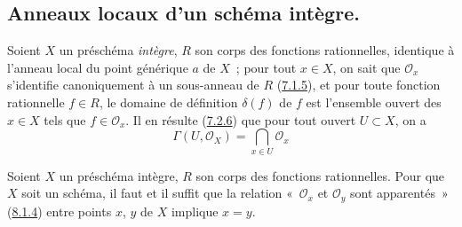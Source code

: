 \subsection{Anneaux locaux d'un schéma intègre.}
\label{subsection:I.8.2-fr}

\begin{env}[8.2.1]
\label{I.8.2.1-fr}
Soient $X$ un préschéma \emph{intègre}, $R$ son corps des fonctions
rationnelles, identique à l'anneau local du point générique $a$ de $X$~; pour
tout $x\in X$, on sait que $\mathscr{O}_x$ s'identifie canoniquement à un
sous-anneau de $R$ (\hyperref[I.7.1.5-fr]{7.1.5}), et pour toute fonction
rationnelle $f\in R$, le domaine de définition $\delta(f)$ de $f$ est
l'ensemble ouvert des $x\in X$ tels que $f\in\mathscr{O}_x$. Il en résulte
(\hyperref[I.7.2.6-fr]{7.2.6}) que pour tout ouvert $U\subset X$, on a
\begin{equation}
  \Gamma(U,\mathscr{O}_X)=\bigcap_{x\in U}\mathscr{O}_x
  \tag{8.2.1.1}\label{I.8.2.1.1-fr}
\end{equation}
\end{env}

\begin{proposition}[8.2.2]
\label{I.8.2.2-fr}
Soient $X$ un préschéma intègre, $R$ son corps des fonctions rationnelles.
Pour que $X$ soit un schéma, il faut et il suffit que la relation
«~$\mathscr{O}_x$ et $\mathscr{O}_y$ sont apparentés~»
\textup{(\hyperref[I.8.1.4-fr]{8.1.4})} entre points $x$, $y$ de $X$ implique $x=y$.
\end{proposition}

